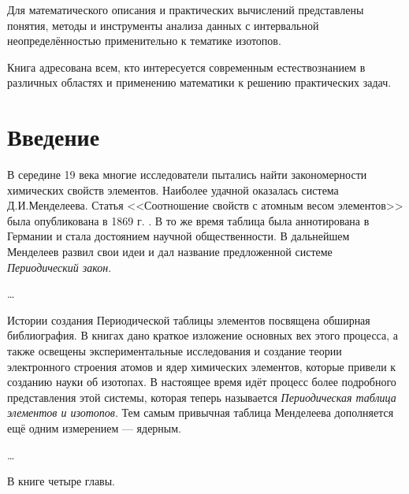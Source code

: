 \documentclass[a5paper,openany]{book}
\begin{document}
	Для математического описания и практических вычислений представлены понятия, методы и инструменты анализа данных с интервальной неопределённостью применительно к тематике изотопов.
	
	Книга адресована всем, кто интересуется современным естествознанием в различных областях и применению математики к решению практических задач.
	
	
	
	
	
	\tableofcontents      %
	
	
	\chapter*{Введение}
	
	
	В середине 19 века многие исследователи пытались найти закономерности химических свойств элементов. Наиболее удачной оказалась система Д.И.Менделеева. Статья <<Соотношение свойств с атомным весом элементов>> была опубликована в 1869 г. \cite{Mendeleev1869ru}. В то же время таблица была аннотирована в Германии \cite{Mendeleev1869} и стала достоянием научной общественности. В дальнейшем Менделеев развил свои идеи и дал название предложенной системе  \emph{Периодический закон}.  
	
	\ldots
	
	
	Истории создания Периодической таблицы элементов посвящена обширная библиография. В книгах \cite{Trifonov1974, Scerri2019} дано краткое изложение основных вех этого процесса, а также освещены экспериментальные исследования и создание теории электронного строения атомов и ядер химических элементов, которые привели к созданию науки об изотопах.  В настоящее время идёт процесс более подробного представления этой системы, которая теперь называется \emph{Периодическая таблица элементов и изотопов}.
	 Тем самым привычная таблица Менделеева дополняется ещё одним измерением --- ядерным.  
	
	\ldots
	
	В книге четыре главы. 
	
\end{document}
